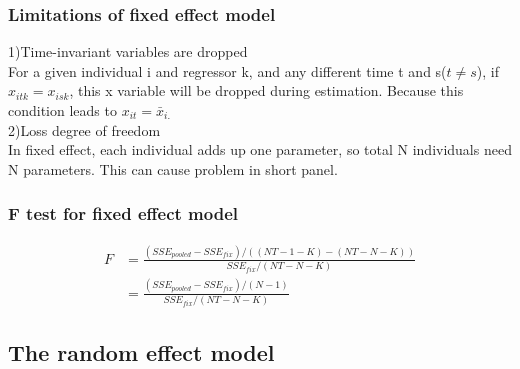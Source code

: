 \documentclass[a4paper]{article}
\begin{document}
\subsubsection{Limitations of fixed effect model}
1)Time-invariant variables are dropped\\
For a given individual i and regressor k, and any different time t and s($t \neq s$), if $x_{itk}=x_{isk}$, this x variable will be dropped during estimation. Because this condition leads to $x_{it} = \bar x_{i.}$\\  
2)Loss degree of freedom\\
In fixed effect, each individual adds up one parameter, so total N individuals need N parameters. This can cause problem in short panel.
\subsubsection{F test for fixed effect model}
\begin{align*}
F & = \frac{(SSE_{pooled}-SSE_{fix})/((NT-1-K)-(NT-N-K))}{SSE_{fix}/(NT-N-K)} \\
&= \frac{(SSE_{pooled}-SSE_{fix})/(N-1)}{SSE_{fix}/(NT-N-K)}
\end{align*}
\subsection{The random effect model}
\end{document}
